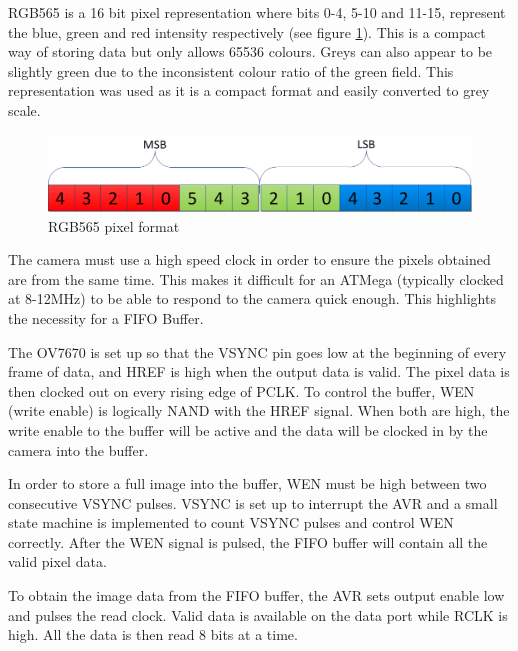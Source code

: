 RGB565 is a 16 bit pixel representation where bits 0-4, 5-10 and 11-15, represent the blue, green and red intensity respectively (see figure \ref{fig:RGB565}). This is a compact way of storing data but only allows 65536 colours. Greys can also appear to be slightly green due to the inconsistent colour ratio of the green field. This representation was used as it is a compact format and easily converted to grey scale.
\begin{figure}
\includegraphics[width = \textwidth]{./Figures/RGB565.png}
\caption{RGB565 pixel format}
\label{fig:RGB565}
\end{figure}

The camera must use a high speed clock in order to ensure the pixels obtained are from the same time. This makes it difficult for an ATMega (typically clocked at 8-12MHz) to be able to respond to the camera quick enough. This highlights the necessity for a FIFO Buffer. 

The OV7670 is set up so that the VSYNC pin goes low at the beginning of every frame of data, and HREF is high when the output data is valid. The pixel data is then clocked out on every rising edge of PCLK. To control the buffer, WEN (write enable) is logically NAND with the HREF signal. When both are high, the write enable to the buffer will be active and the data will be clocked in by the camera into the buffer. 

In order to store a full image into the buffer, WEN must be high between two consecutive VSYNC pulses. VSYNC is set up to interrupt the AVR and a small state machine is implemented to count VSYNC pulses and control WEN correctly. After the WEN signal is pulsed, the FIFO buffer will contain all the valid pixel data.

To obtain the image data from the FIFO buffer, the AVR sets output enable low and pulses the read clock. Valid data is available on the data port while RCLK is high. All the data is then read 8 bits at a time.

